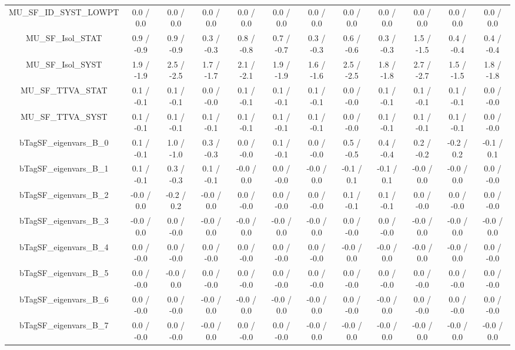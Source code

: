 \begin{table}[htbp]
\begin{center}
\begin{tabular}{|c|c|c|c|c|c|c|c|c|c|c|c|}
  MU_SF_ID_SYST_LOWPT & 0.0 / 0.0 & 0.0 / 0.0 & 0.0 / 0.0 & 0.0 / 0.0 & 0.0 / 0.0 & 0.0 / 0.0 & 0.0 / 0.0 & 0.0 / 0.0 & 0.0 / 0.0 & 0.0 / 0.0 & 0.0 / 0.0 \\ 
  MU_SF_Isol_STAT & 0.9 / -0.9 & 0.9 / -0.9 & 0.3 / -0.3 & 0.8 / -0.8 & 0.7 / -0.7 & 0.3 / -0.3 & 0.6 / -0.6 & 0.3 / -0.3 & 1.5 / -1.5 & 0.4 / -0.4 & 0.4 / -0.4 \\ 
  MU_SF_Isol_SYST & 1.9 / -1.9 & 2.5 / -2.5 & 1.7 / -1.7 & 2.1 / -2.1 & 1.9 / -1.9 & 1.6 / -1.6 & 2.5 / -2.5 & 1.8 / -1.8 & 2.7 / -2.7 & 1.5 / -1.5 & 1.8 / -1.8 \\ 
  MU_SF_TTVA_STAT & 0.1 / -0.1 & 0.1 / -0.1 & 0.0 / -0.0 & 0.1 / -0.1 & 0.1 / -0.1 & 0.1 / -0.1 & 0.0 / -0.0 & 0.1 / -0.1 & 0.1 / -0.1 & 0.1 / -0.1 & 0.0 / -0.0 \\ 
  MU_SF_TTVA_SYST & 0.1 / -0.1 & 0.1 / -0.1 & 0.1 / -0.1 & 0.1 / -0.1 & 0.1 / -0.1 & 0.1 / -0.1 & 0.0 / -0.0 & 0.1 / -0.1 & 0.1 / -0.1 & 0.1 / -0.1 & 0.0 / -0.0 \\ 
  bTagSF_eigenvars_B_0 & 0.1 / -0.1 & 1.0 / -1.0 & 0.3 / -0.3 & 0.0 / -0.0 & 0.1 / -0.1 & 0.0 / -0.0 & 0.5 / -0.5 & 0.4 / -0.4 & 0.2 / -0.2 & -0.2 / 0.2 & -0.1 / 0.1 \\ 
  bTagSF_eigenvars_B_1 & 0.1 / -0.1 & 0.3 / -0.3 & 0.1 / -0.1 & -0.0 / 0.0 & 0.0 / -0.0 & -0.0 / 0.0 & -0.1 / 0.1 & -0.1 / 0.1 & -0.0 / 0.0 & -0.0 / 0.0 & 0.0 / -0.0 \\ 
  bTagSF_eigenvars_B_2 & -0.0 / 0.0 & -0.2 / 0.2 & -0.0 / 0.0 & 0.0 / -0.0 & 0.0 / -0.0 & 0.0 / -0.0 & 0.1 / -0.1 & 0.1 / -0.1 & 0.0 / -0.0 & 0.0 / -0.0 & 0.0 / -0.0 \\ 
  bTagSF_eigenvars_B_3 & -0.0 / 0.0 & 0.0 / -0.0 & -0.0 / 0.0 & -0.0 / 0.0 & -0.0 / 0.0 & -0.0 / 0.0 & 0.0 / -0.0 & 0.0 / -0.0 & -0.0 / 0.0 & -0.0 / 0.0 & -0.0 / 0.0 \\ 
  bTagSF_eigenvars_B_4 & 0.0 / -0.0 & 0.0 / -0.0 & 0.0 / -0.0 & 0.0 / -0.0 & 0.0 / -0.0 & 0.0 / -0.0 & -0.0 / 0.0 & -0.0 / 0.0 & -0.0 / 0.0 & -0.0 / 0.0 & 0.0 / -0.0 \\ 
  bTagSF_eigenvars_B_5 & 0.0 / -0.0 & -0.0 / 0.0 & 0.0 / -0.0 & 0.0 / -0.0 & 0.0 / -0.0 & 0.0 / -0.0 & 0.0 / -0.0 & 0.0 / -0.0 & 0.0 / -0.0 & 0.0 / -0.0 & 0.0 / -0.0 \\ 
  bTagSF_eigenvars_B_6 & 0.0 / -0.0 & 0.0 / -0.0 & -0.0 / 0.0 & -0.0 / 0.0 & -0.0 / 0.0 & -0.0 / 0.0 & 0.0 / -0.0 & -0.0 / 0.0 & 0.0 / -0.0 & 0.0 / -0.0 & 0.0 / -0.0 \\ 
  bTagSF_eigenvars_B_7 & 0.0 / -0.0 & 0.0 / -0.0 & -0.0 / 0.0 & 0.0 / -0.0 & 0.0 / -0.0 & -0.0 / 0.0 & -0.0 / 0.0 & -0.0 / 0.0 & -0.0 / 0.0 & -0.0 / 0.0 & -0.0 / 0.0 \\ 

\end{tabular}
\end{center}
\end{table}
